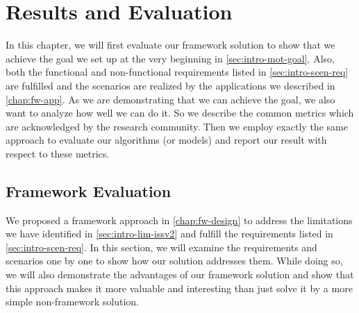 \chapter{Results and Evaluation}
\label{chap:Evaluation}


In this chapter, we will first evaluate our framework solution 
to show that we achieve the goal we set up at the very beginning in 
\autoref{sec:intro-mot-goal}.
Also, both the functional and non-functional requirements listed in
\autoref{sec:intro-scen-req} are fulfilled and the scenarios are
realized by the applications we described in \autoref{chap:fw-app}.
As we are demonstrating that we can achieve the goal, we also want to analyze how
well we can do it. So we describe the common metrics which are acknowledged by
the research community. Then we employ exactly the same approach
to evaluate our algorithms (or models) and report our result with respect to these
metrics.

\section{Framework Evaluation}
\label{sec:Eval-framework}

We proposed a framework approach in \autoref{chap:fw-design} to address the
limitations we have identified in \autoref{sec:intro-lim-issv2} and fulfill the requirements 
listed in \autoref{sec:intro-scen-req}.
In this section, we will examine the requirements and scenarios one by one to 
show how our solution addresses them. 
While doing so, we will also demonstrate the advantages
of our framework solution and show that this approach makes it more valuable and
interesting than just solve it by a more simple non-framework solution.

